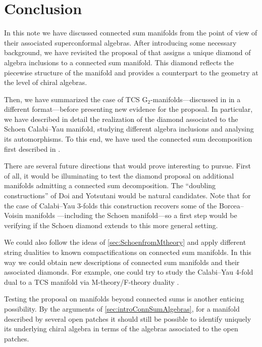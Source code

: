 \documentclass{pspum-l}
\theoremstyle{definition}
\theoremstyle{remark}
\numberwithin{equation}{section}
\begin{document}
\section{Conclusion}

\label{sec:Conclusion}

In this note we have discussed connected sum manifolds from the point of view of their associated superconformal algebras. After introducing some necessary background, we have revisited the proposal of \cite{Fiset:2021ruv} that assigns a unique diamond of algebra inclusions to a connected sum manifold. This diamond reflects the piecewise structure of the manifold and provides a counterpart to the geometry at the level of chiral algebras.

Then, we have summarized the case of TCS G$_2$-manifolds---discussed in \cite{Fiset:2018huv, Fiset:2021ruv} in a different format---before presenting new evidence for the proposal. In particular, we have described in detail the realization of the diamond associated to the Schoen Calabi--Yau manifold, studying different algebra inclusions and analysing its automorphisms. To this end, we have used the connected sum decomposition first described in \cite{Braun:2017uku}.

There are several future directions that would prove interesting to pursue. First of all, it would be illuminating to test the diamond proposal on additional manifolds admitting a connected sum decomposition. The ``doubling constructions'' of Doi and Yotsutani \cite{Doi:2013, Doi:2015, Doi:2019} would be natural candidates. Note that for the case of Calabi--Yau 3-folds \cite{Doi:2013} this construction recovers some of the Borcea--Voisin manifolds \cite{Borcea:1996mxz, Voisin:246106}---including the Schoen manifold---so a first step would be verifying if the Schoen diamond extends to this more general setting.

We could also follow the ideas of \cref{sec:SchoenfromMtheory} and apply different string dualities to known compactifications on connected sum manifolds. In this way we could obtain new descriptions of connected sum manifolds and their associated diamonds. For example, one could try to study the Calabi--Yau 4-fold dual to a TCS manifold via M-theory/F-theory duality \cite{Braun:2017uku}.

Testing the proposal on manifolds beyond connected sums is another enticing possibility. By the arguments of \cref{sec:introConnSumAlgebras}, for a manifold described by several open patches it should still be possible to identify uniquely its underlying chiral algebra in terms of the algebras associated to the open patches.
\end{document}
